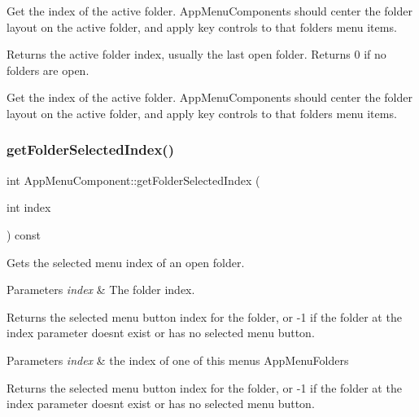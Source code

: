 Get the index of the active folder. App\+Menu\+Components should center the folder layout on the active folder, and apply key controls to that folder\textquotesingle{}s menu items.

\begin{DoxyReturn}{Returns}
the active folder index, usually the last open folder. Returns 0 if no folders are open.
\end{DoxyReturn}
Get the index of the active folder. App\+Menu\+Components should center the folder layout on the active folder, and apply key controls to that folder\textquotesingle{}s menu items. \mbox{\label{classAppMenuComponent_aabc1b6657b6cea28d9f94c3530ccfcff}} 
\subsubsection{\texorpdfstring{get\+Folder\+Selected\+Index()}{getFolderSelectedIndex()}}
{\footnotesize\ttfamily int App\+Menu\+Component\+::get\+Folder\+Selected\+Index (\begin{DoxyParamCaption}\item[{int}]{index }\end{DoxyParamCaption}) const\hspace{0.3cm}{\ttfamily [protected]}}

Gets the selected menu index of an open folder.


\begin{DoxyParams}{Parameters}
{\em index} & The folder index.\\
\hline
\end{DoxyParams}
\begin{DoxyReturn}{Returns}
the selected menu button index for the folder, or -\/1 if the folder at the index parameter doesn\textquotesingle{}t exist or has no selected menu button.
\end{DoxyReturn}

\begin{DoxyParams}{Parameters}
{\em index} & the index of one of this menu\textquotesingle{}s App\+Menu\+Folders \\
\hline
\end{DoxyParams}
\begin{DoxyReturn}{Returns}
the selected menu button index for the folder, or -\/1 if the folder at the index parameter doesn\textquotesingle{}t exist or has no selected menu button. 
\end{DoxyReturn}
\mbox{\label{classAppMenuComponent_a82eba35fa1f3a80ba178d30b6889d49e}} 
